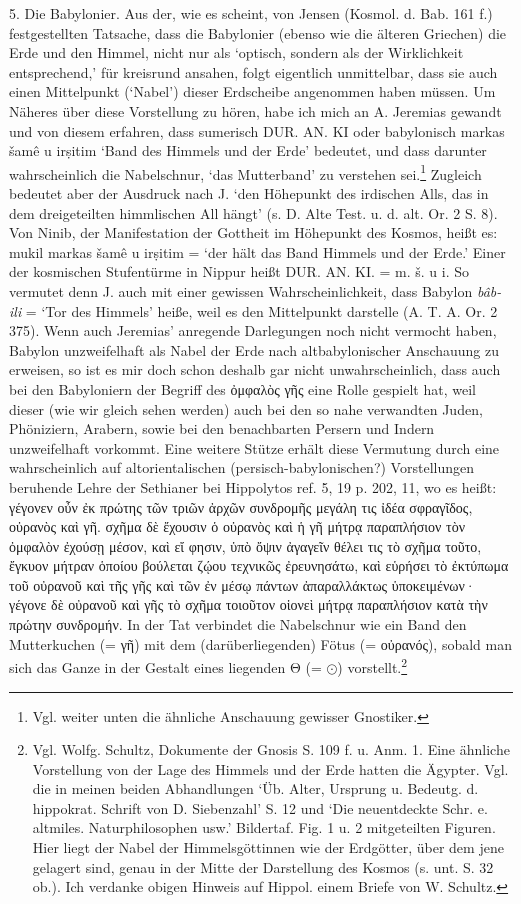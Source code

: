 \documentclass[a4paper, 11pt, oneside]{article}
\begin{document}
5. Die Babylonier. Aus der, wie es scheint, von Jensen (Kosmol. d. Bab. 161 f.) festgestellten Tatsache, dass die Babylonier (ebenso wie die älteren Griechen) die Erde und den Himmel, nicht nur als `optisch, sondern als der Wirklichkeit entsprechend,' für kreisrund ansahen, folgt eigentlich unmittelbar, dass sie auch einen Mittelpunkt (`Nabel') dieser Erdscheibe angenommen haben müssen. Um Näheres über diese Vorstellung zu hören, habe ich mich an A. Jeremias gewandt und von diesem erfahren, dass sumerisch DUR. AN. KI oder babylonisch markas šamê u irṣitim `Band des Himmels und der Erde' bedeutet, und dass darunter wahrscheinlich die Nabelschnur, `das Mutterband' zu verstehen sei.\footnote{Vgl. weiter unten die ähnliche Anschauung gewisser Gnostiker.} Zugleich bedeutet aber der Ausdruck nach J. `den Höhepunkt des irdischen Alls, das in dem dreigeteilten himmlischen All hängt' (s. D. Alte Test. u. d. alt. Or. 2 S. 8). Von Ninib, der Manifestation der Gottheit im Höhepunkt des Kosmos, heißt es: mukil markas šamê u irṣitim = `der hält das Band Himmels und der Erde.' Einer der kosmischen Stufentürme in Nippur heißt DUR. AN. KI. = m. š. u i. So vermutet denn J. auch mit einer gewissen Wahrscheinlichkeit, dass Babylon \emph{bâb-ili} = `Tor des Himmels' heiße, weil es den Mittelpunkt darstelle (A. T. A. Or. 2 375). Wenn auch Jeremias' anregende Darlegungen noch nicht vermocht haben, Babylon unzweifelhaft als Nabel der Erde nach altbabylonischer Anschauung zu erweisen, so ist es mir doch schon deshalb gar nicht unwahrscheinlich, dass auch bei den Babyloniern der Begriff des ὀμφαλὸς γῆς eine Rolle gespielt hat, weil dieser (wie wir gleich sehen werden) auch bei den so nahe verwandten Juden, Phöniziern, Arabern, sowie bei den benachbarten Persern und Indern unzweifelhaft vorkommt. Eine weitere Stütze erhält diese Vermutung durch eine wahrscheinlich auf altorientalischen (persisch-babylonischen?) Vorstellungen beruhende Lehre der Sethianer bei Hippolytos ref. 5, 19 p. 202, 11, wo es heißt: γέγονεν οὖν ἐκ πρώτης τῶν τριῶν ἀρχῶν συνδρομῆς μεγάλη τις ἰδέα σφραγῖδος, οὐρανὸς καὶ γῆ. σχῆμα δὲ ἔχουσιν ὁ οὐρανὸς καὶ ἡ γῆ μήτρᾳ παραπλήσιον τὸν ὀμφαλὸν ἐχούσῃ μέσον, καὶ εἴ φησιν, ὑπὸ ὄψιν ἀγαγεῖν θέλει τις τὸ σχῆμα τοῦτο, ἔγκυον μήτραν ὁποίου βούλεται ζῴου τεχνικῶς ἐρευνησάτω, καὶ εὑρήσει τὸ ἐκτύπωμα τοῦ οὐρανοῦ καὶ τῆς γῆς καὶ τῶν ἐν μέσῳ πάντων ἀπαραλλάκτως ὑποκειμένων· γέγονε δὲ οὐρανοῦ καὶ γῆς τὸ σχῆμα τοιοῦτον οἱονεὶ μήτρᾳ παραπλήσιον κατὰ τὴν πρώτην συνδρομήν. In der Tat verbindet die Nabelschnur wie ein Band den Mutterkuchen (= γῆ) mit dem (darüberliegenden) Fötus (= οὐρανός), sobald man sich das Ganze in der Gestalt eines liegenden Θ (= $\odot$) vorstellt.\footnote{Vgl. Wolfg. Schultz, Dokumente der Gnosis S. 109 f. u. Anm. 1. Eine ähnliche Vorstellung von der Lage des Himmels und der Erde hatten die Ägypter. Vgl. die in meinen beiden Abhandlungen `Üb. Alter, Ursprung u. Bedeutg. d. hippokrat. Schrift von D. Siebenzahl' S. 12 und `Die neuentdeckte Schr. e. altmiles. Naturphilosophen usw.' Bildertaf. Fig. 1 u. 2 mitgeteilten Figuren. Hier liegt der Nabel der Himmelsgöttinnen wie der Erdgötter, über dem jene gelagert sind, genau in der Mitte der Darstellung des Kosmos (s. unt. S. 32 ob.). Ich verdanke obigen Hinweis auf Hippol. einem Briefe von W. Schultz.}
\end{document}
